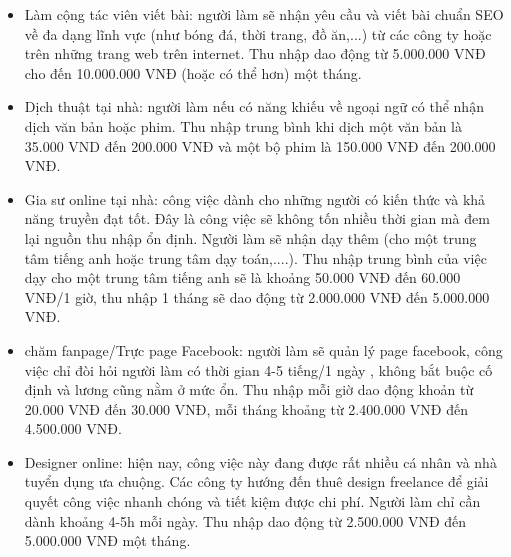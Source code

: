 \begin{itemize}
    \item Làm cộng tác viên viết bài: người làm sẽ nhận yêu cầu và viết bài chuẩn SEO về đa dạng lĩnh vực (như bóng đá, thời trang, đồ ăn,...) từ các công ty hoặc trên những trang web trên internet. Thu nhập dao động từ 5.000.000 VNĐ cho đến 10.000.000 VNĐ (hoặc có thể hơn) một tháng.
    \item Dịch thuật tại nhà: người làm nếu có năng khiếu về ngoại ngữ có thể nhận dịch văn bản hoặc phim. Thu nhập trung bình khi dịch một văn bản là 35.000 VND đến 200.000 VNĐ và một bộ phim là 150.000 VNĐ đến 200.000 VNĐ.
    \item Gia sư online tại nhà: công việc dành cho những người có kiến thức và khả năng truyền đạt tốt. Đây là công việc sẽ không tốn nhiều thời gian mà đem lại nguồn thu nhập ổn định. Người làm sẽ nhận dạy thêm (cho một trung tâm tiếng anh hoặc trung tâm dạy toán,....). Thu nhập trung bình của việc dạy cho một trung tâm tiếng anh sẽ là khoảng 50.000 VNĐ đến 60.000 VNĐ/1 giờ, thu nhập 1 tháng sẽ dao động từ 2.000.000 VNĐ đến 5.000.000 VNĐ.
    \item chăm fanpage/Trực page Facebook: người làm sẽ quản lý page facebook, công việc chỉ đòi hỏi người làm có thời gian 4-5 tiếng/1 ngày , không bắt buộc cố định và lương cũng nằm ở mức ổn. Thu nhập mỗi giờ dao động khoản từ 20.000 VNĐ đến 30.000 VNĐ, mỗi tháng khoảng từ 2.400.000 VNĐ đến 4.500.000 VNĐ.
    \item Designer online: hiện nay, công việc này đang được rất nhiều cá nhân và nhà tuyển dụng ưa chuộng. Các công ty hướng đến thuê design freelance để giải quyết công việc nhanh chóng và tiết kiệm được chi phí. Người làm chỉ cần dành khoảng 4-5h mỗi ngày. Thu nhập dao động từ 2.500.000 VNĐ đến 5.000.000 VNĐ một tháng.
\end{itemize}

